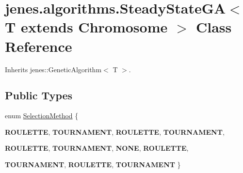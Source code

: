 \hypertarget{classjenes_1_1algorithms_1_1_steady_state_g_a_3_01_t_01extends_01_chromosome_01_4}{
\section{jenes.algorithms.SteadyStateGA$<$ T extends Chromosome $>$ Class Reference}
\label{classjenes_1_1algorithms_1_1_steady_state_g_a_3_01_t_01extends_01_chromosome_01_4}
}
Inherits jenes::GeneticAlgorithm$<$ T $>$.

\subsection*{Public Types}
\begin{CompactItemize}
\item 
enum \hyperlink{classjenes_1_1algorithms_1_1_steady_state_g_a_3_01_t_01extends_01_chromosome_01_4_e3534264ad652fd69b6d2a619b16e13b}{SelectionMethod} \{ \par
\textbf{ROULETTE}, 
\textbf{TOURNAMENT}, 
\textbf{ROULETTE}, 
\textbf{TOURNAMENT}, 
\par
\textbf{ROULETTE}, 
\textbf{TOURNAMENT}, 
\textbf{NONE}, 
\textbf{ROULETTE}, 
\par
\textbf{TOURNAMENT}, 
\textbf{ROULETTE}, 
\textbf{TOURNAMENT}
 \}
\end{CompactItemize}
